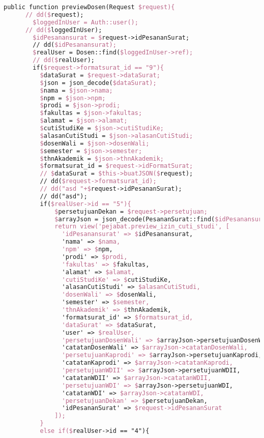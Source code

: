 \begin{lstlisting}[language=tex,basicstyle=\tiny,caption=PesanansuratController.php]
    public function previewDosen(Request $request){
      // dd($request);
        $loggedInUser = Auth::user();
      // dd($loggedInUser);
        $idPesanansurat = $request->idPesananSurat;
        // dd($idPesanansurat);
        $realUser = Dosen::find($loggedInUser->ref);
        // dd($realUser);
        if($request->formatsurat_id == "9"){
          $dataSurat = $request->dataSurat;
          $json = json_decode($dataSurat);
          $nama = $json->nama;
          $npm = $json->npm;
          $prodi = $json->prodi;
          $fakultas = $json->fakultas;
          $alamat = $json->alamat;
          $cutiStudiKe = $json->cutiStudiKe;
          $alasanCutiStudi = $json->alasanCutiStudi;
          $dosenWali = $json->dosenWali;
          $semester = $json->semester;
          $thnAkademik = $json->thnAkademik;
          $formatsurat_id = $request->idFormatSurat;
          // $dataSurat = $this->buatJSON($request);
          // dd($request->formatsurat_id);
          // dd("asd "+$request->idPesananSurat);
          // dd("asd");
          if($realUser->id == "5"){
              $persetujuanDekan = $request->persetujuan;
              $arrayJson = json_decode(PesananSurat::find($idPesanansurat)->dataSurat);
              return view('pejabat.preview_izin_cuti_studi', [
                'idPesanansurat' => $idPesanansurat,
                'nama' => $nama,
                'npm' => $npm,
                'prodi' => $prodi,
                'fakultas' => $fakultas,
                'alamat' => $alamat,
                'cutiStudiKe' => $cutiStudiKe,
                'alasanCutiStudi' => $alasanCutiStudi,
                'dosenWali' => $dosenWali,
                'semester' => $semester,
                'thnAkademik' => $thnAkademik,
                'formatsurat_id' => $formatsurat_id,
                'dataSurat' => $dataSurat,
                'user' => $realUser,
                'persetujuanDosenWali' => $arrayJson->persetujuanDosenWali,
                'catatanDosenWali' => $arrayJson->catatanDosenWali,
                'persetujuanKaprodi' => $arrayJson->persetujuanKaprodi,
                'catatanKaprodi' => $arrayJson->catatanKaprodi,
                'persetujuanWDII' => $arrayJson->persetujuanWDII,
                'catatanWDII' => $arrayJson->catatanWDII,
                'persetujuanWDI' => $arrayJson->persetujuanWDI,
                'catatanWDI' => $arrayJson->catatanWDI,
                'persetujuanDekan' => $persetujuanDekan,
                'idPesananSurat' => $request->idPesananSurat
              ]);
          }
          else if($realUser->id == "4"){

\end{lstlisting}
